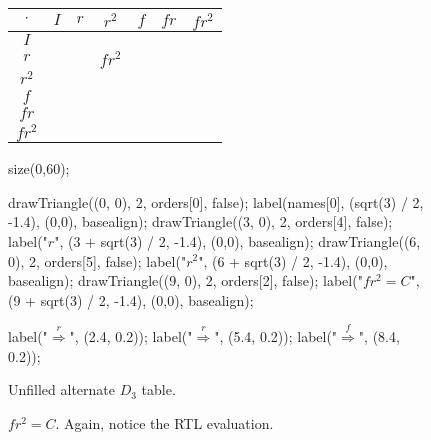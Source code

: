 \documentclass[../gatm.tex]{subfiles}
\begin{document}
\begin{figure}[h]
	\begin{center}
		\begin{minipage}[b]{0.35\textwidth}
			\centering
			\begin{tabular}{c|cccccc}
				\hline
				$\cdot$ & $I$ & $r$ & $r^2$ & $f$ & $fr$ & $fr^2$ \\ \hline
				\rowcolor{light-gray}
				$I$    &   &   &   &   &   &   \\ 
				$r$    &   &   & $fr^2$ &   &   &   \\ 
				\rowcolor{light-gray}
				$r^2$    &   &   &   &   &   &   \\ 
				$f$    &   &   &   &   &   &   \\ 
				\rowcolor{light-gray}
				$fr$    &   &   &   &   &   &   \\ 
				$fr^2$    &   &   &   &   &   &   \\ \hline
			\end{tabular}
			\vspace*{0.5\baselineskip}
		\end{minipage}
		\hfill
		\begin{minipage}[b]{0.55\textwidth}
			\centering
			\begin{asy}[width=\textwidth]
			size(0,60);
			
			drawTriangle((0, 0), 2, orders[0], false);
			label(names[0], (sqrt(3) / 2, -1.4), (0,0), basealign);
			drawTriangle((3, 0), 2, orders[4], false);
			label("$r$", (3 + sqrt(3) / 2, -1.4), (0,0), basealign);
			drawTriangle((6, 0), 2, orders[5], false);
			label("$r^2$", (6 + sqrt(3) / 2, -1.4), (0,0), basealign);
			drawTriangle((9, 0), 2, orders[2], false);
			label("$fr^2=C$", (9 + sqrt(3) / 2, -1.4), (0,0), basealign);
			
			label("$\stackrel{r}{\Longrightarrow}$", (2.4, 0.2));
			label("$\stackrel{r}{\Longrightarrow}$", (5.4, 0.2));
			label("$\stackrel{f}{\Longrightarrow}$", (8.4, 0.2));
			\end{asy}
		\end{minipage}
	\end{center}
	\vspace*{-2\baselineskip}
	\begin{center}
		\begin{minipage}[t]{0.35\textwidth}
			\caption{Unfilled alternate $D_3$ table.}
			\label{fig:alttable}
		\end{minipage}
		\hfill
		\begin{minipage}[t]{0.55\textwidth}
			\caption{$fr^2=C$. Again, notice the RTL evaluation.}
			\label{fig:fr2}
		\end{minipage}
	\end{center}
\end{figure}
\end{document}
